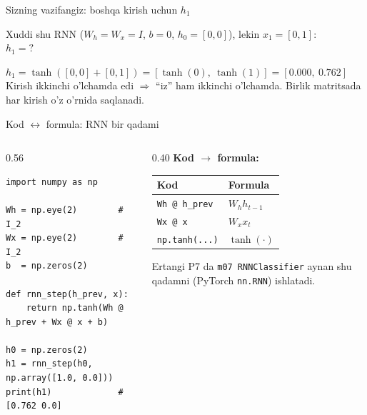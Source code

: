\documentclass[aspectratio=169,11pt]{beamer}
\begin{document}
\begin{frame}{Sizning vazifangiz: boshqa kirish uchun $h_1$}
  \begin{tcolorbox}[warnbox,title=Savol --- 90 soniya]
    \small
    Xuddi shu RNN ($W_h=W_x=I$, $b=0$, $h_0=[0,0]$), lekin $x_1=[0,1]$:\\[4pt]
    \textbf{\large $h_1 = ?$}
  \end{tcolorbox}
  \pause
  \begin{tcolorbox}[okbox,title=Javob]
    \small
    $h_1 = \tanh([0,0]+[0,1]) = [\tanh(0),\ \tanh(1)] = \mathbf{[0.000,\ 0.762]}$\\[3pt]
    \footnotesize Kirish ikkinchi o'lchamda edi $\Rightarrow$ ``iz'' ham ikkinchi
    o'lchamda. Birlik matritsada har kirish o'z o'rnida saqlanadi.
  \end{tcolorbox}
\end{frame}

\begin{frame}[fragile]{Kod $\leftrightarrow$ formula: RNN bir qadami}
  \begin{columns}[T]
    \begin{column}{0.56\textwidth}
\begin{lstlisting}
import numpy as np

Wh = np.eye(2)        # I_2
Wx = np.eye(2)        # I_2
b  = np.zeros(2)

def rnn_step(h_prev, x):
    return np.tanh(Wh @ h_prev + Wx @ x + b)

h0 = np.zeros(2)
h1 = rnn_step(h0, np.array([1.0, 0.0]))
print(h1)             # [0.762 0.0]
\end{lstlisting}
    \end{column}
    \begin{column}{0.40\textwidth}
      \textbf{Kod $\to$ formula:}\\[3pt]
      \footnotesize
      \begin{tabular}{p{2.0cm}p{2.0cm}}
        \toprule
        Kod & Formula \\
        \midrule
        \texttt{Wh @ h\_prev} & $W_h h_{t-1}$ \\
        \texttt{Wx @ x} & $W_x x_t$ \\
        \texttt{np.tanh(...)} & $\tanh(\cdot)$ \\
        \bottomrule
      \end{tabular}
      \vspace{4pt}
      \begin{tcolorbox}[okbox,top=2pt,bottom=2pt]
        \footnotesize
        Ertangi P7 da \texttt{m07 RNNClassifier} aynan shu qadamni (PyTorch
        \texttt{nn.RNN}) ishlatadi.
      \end{tcolorbox}
    \end{column}
  \end{columns}
\end{frame}
\end{document}
